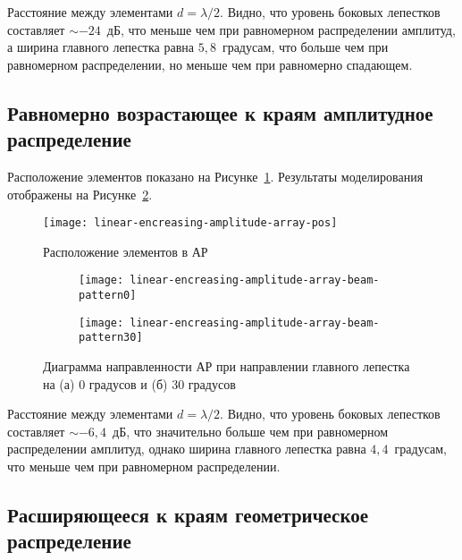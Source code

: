 Расстояние между элементами $d=\lambda/2$. Видно, что уровень боковых лепестков составляет $\sim-24$~дБ, 
что меньше чем при равномерном распределении амплитуд, 
а ширина главного лепестка равна $5,8$~градусам, 
что больше чем при равномерном распределении, но меньше чем при равномерно спадающем.

\subsection{Равномерно возрастающее к краям амплитудное распределение}

Расположение элементов показано на Рисунке~\ref{fig:linear-encreasing-amplitude-array-pos}. Результаты моделирования отображены на Рисунке~\ref{fig:linear-encreasing-amplitude-array-modeling}.

\begin{figure}[!ht]
    \centering
    \texttt{[image: linear-encreasing-amplitude-array-pos]}
    \caption{Расположение элементов в АР}
    \label{fig:linear-encreasing-amplitude-array-pos}
\end{figure}


\begin{figure}[!ht]
    \centering
    \begin{subfigure}[b]{0.49\textwidth}
        \centering
        \hspace*{-3ex}
        \texttt{[image: linear-encreasing-amplitude-array-beam-pattern0]}
        \caption{}%
    \end{subfigure}
    \hfill
    \begin{subfigure}[b]{0.49\textwidth}
        \centering
        \hspace*{-3ex}
        \texttt{[image: linear-encreasing-amplitude-array-beam-pattern30]}
        \caption{}%
    \end{subfigure}
    \caption{%
    Диаграмма направленности АР при направлении главного лепестка на (а) 0 градусов и (б) 30 градусов
    }%
    \label{fig:linear-encreasing-amplitude-array-modeling}
\end{figure}

Расстояние между элементами $d=\lambda/2$. Видно, что уровень боковых лепестков составляет $\sim-6,4$~дБ, 
что значительно больше чем при равномерном распределении амплитуд, 
однако ширина главного лепестка равна $4,4$~градусам, 
что меньше чем при равномерном распределении.

\subsection{Расширяющееся к краям геометрическое распределение}

